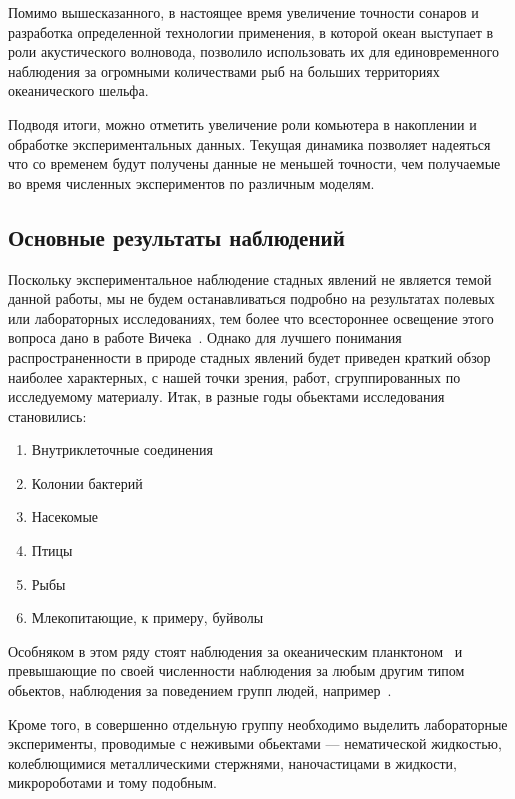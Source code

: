 	Помимо вышесказанного, в настоящее время увеличение точности сонаров и разработка определенной технологии применения, в которой океан выступает в роли акустического волновода, позволило использовать их для единовременного наблюдения за огромными количествами рыб на больших территориях океанического шельфа.~\cite{makris2006}

	Подводя итоги, можно отметить увеличение роли комьютера в накоплении и обработке экспериментальных данных. Текущая динамика позволяет надеяться что со временем будут получены данные не меньшей точности, чем получаемые во время численных экспериментов по различным моделям.

	\subsection{Основные результаты наблюдений} %
	\label{sub:ExperimentalResults}
	Поскольку экспериментальное наблюдение стадных явлений не является темой данной работы, мы не будем останавливаться подробно на результатах полевых или лабораторных исследованиях, тем более что всестороннее освещение этого вопроса дано в работе Вичека~\cite{vicsek2012}. Однако для лучшего понимания распространенности в природе стадных явлений будет приведен краткий обзор наиболее характерных, с нашей точки зрения, работ, сгруппированных по исследуемому материалу. Итак, в разные годы обьектами исследования становились:
	\begin{enumerate}
		\item Внутриклеточные соединения~\cite{chowdhury2006,keller1971}
		\item Колонии бактерий~\cite{czirok1998,csahok1997}
		\item Насекомые~\cite{buhl2006}
		\item Птицы~\cite{ballerini2008,selous1931,dellariccia2008,biro2006,major1978,nagy2010}
		\item Рыбы~\cite{cambui2012,makris2009,parrish1997}
		\item Млекопитающие, к примеру, буйволы~\cite{sinclair1977}
	\end{enumerate}
	Особняком в этом ряду стоят наблюдения за океаническим планктоном~\cite{seuront2004} и превышающие по своей численности наблюдения за любым другим типом обьектов, наблюдения за поведением групп людей, например~\cite{parisi2009,moussaid2011}.%

	Кроме того, в совершенно отдельную группу необходимо выделить лабораторные эксперименты, проводимые с неживыми обьектами --- нематической жидкостью, колеблющимися металлическими стержнями, наночастицами в жидкости, микророботами и тому подобным.~\cite{schaller2010,turgut2008,blair2003}

